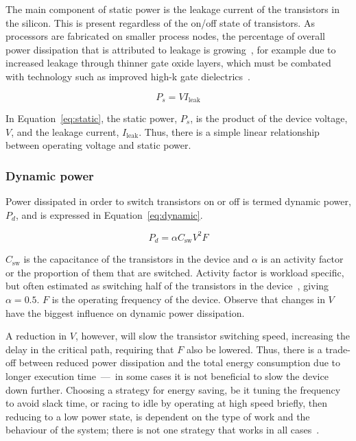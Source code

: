 \documentclass[a4paper,twocolumn,DIV=16]{scrartcl}
\begin{document}
The main component of static power is the leakage current of the transistors in
the silicon. This is present regardless of the on/off state of transistors. As
processors are fabricated on smaller process nodes, the percentage of overall
power dissipation that is attributed to leakage is
growing~\cite{kim2003leakage}, for example due to increased leakage through
thinner gate oxide layers, which must be combated with technology such as
improved high-k gate dielectrics~\cite{highkreview}.

\begin{equation}
P_s = VI_{\text{leak}}
\label{eq:static}
\end{equation}

In Equation~\ref{eq:static}, the static power, $P_s$, is the product of the
device voltage, $V$, and the leakage current, $I_{\text{leak}}$.  Thus, there is
a simple linear relationship between operating voltage and static power.

\subsubsection*{Dynamic power}

Power dissipated in order to switch transistors on or off is termed dynamic
power, $P_d$, and is expressed in Equation~\ref{eq:dynamic}.

\begin{equation}
P_d = \alpha C_\text{sw}V^{2}F
\label{eq:dynamic}
\end{equation}

$C_\text{sw}$ is the capacitance of the transistors in the device and $\alpha$
is an activity factor or the proportion of them that are switched. Activity
factor is workload specific, but often estimated as switching half of the
transistors in the device~\cite{Brooks2000}, giving $\alpha = 0.5$. $F$ is the
operating frequency of the device. Observe that changes in $V$ have the biggest
influence on dynamic power dissipation.

A reduction in $V$, however, will slow the transistor switching speed,
increasing the delay in the critical path, requiring that $F$ also be lowered.
Thus, there is a trade-off between reduced power dissipation and the total
energy consumption due to longer execution time~---~in some cases it is not
beneficial to slow the device down further. Choosing a strategy for energy
saving, be it tuning the frequency to avoid slack time, or racing to idle by
operating at high speed briefly, then reducing to a low power state, is
dependent on the type of work and the behaviour of the system; there is not one
strategy that works in all cases~\cite{Amur2008}.
\end{document}
